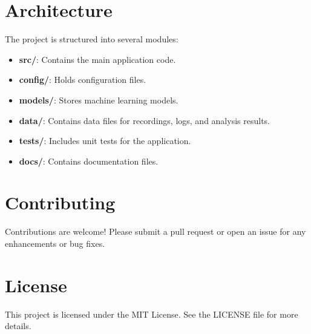 \documentclass{article}
\begin{document}
\section{Architecture}
The project is structured into several modules:
\begin{itemize}
    \item \textbf{src/}: Contains the main application code.
    \item \textbf{config/}: Holds configuration files.
    \item \textbf{models/}: Stores machine learning models.
    \item \textbf{data/}: Contains data files for recordings, logs, and analysis results.
    \item \textbf{tests/}: Includes unit tests for the application.
    \item \textbf{docs/}: Contains documentation files.
\end{itemize}

\section{Contributing}
Contributions are welcome! Please submit a pull request or open an issue for any enhancements or bug fixes.

\section{License}
This project is licensed under the MIT License. See the LICENSE file for more details.
\end{document}
